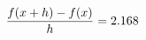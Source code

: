 \documentclass[preview]{standalone}
\begin{document}
\begin{align*}
\special{dvisvgm:raw <g id='unique000'>}\frac{f(x+h)-f(x)}{h} = 2.168\special{dvisvgm:raw </g>}
\end{align*}
\end{document}
